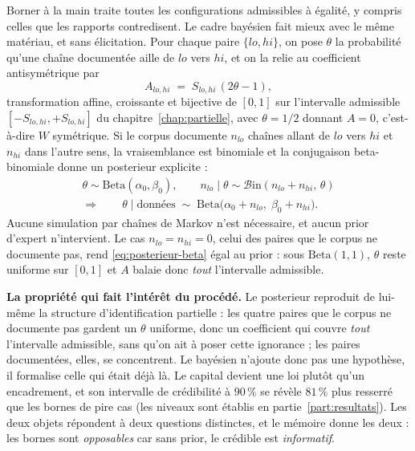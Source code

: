 Borner à la main traite toutes les configurations admissibles à égalité, y compris celles que
les rapports contredisent. Le cadre bayésien fait mieux avec le même matériau, et sans
élicitation. Pour chaque paire $\{lo,hi\}$, on pose $\theta$ la probabilité qu'une chaîne
documentée aille de $lo$ vers $hi$, et on la relie au coefficient antisymétrique par
\[
  A_{lo,hi} \;=\; S_{lo,hi}\,(2\theta - 1),
\]
transformation affine, croissante et bijective de $[0,1]$ sur l'intervalle admissible
$[-S_{lo,hi},+S_{lo,hi}]$ du chapitre~\ref{chap:partielle}, avec $\theta=1/2$ donnant $A=0$,
c'est-à-dire $W$ symétrique. Si le corpus documente $n_{lo}$ chaînes allant de $lo$ vers $hi$ et
$n_{hi}$ dans l'autre sens, la vraisemblance est binomiale et la conjugaison beta-binomiale
donne un posterieur explicite :
\begin{equation}
  \begin{gathered}
  \theta \sim \mathrm{Beta}(\alpha_0,\beta_0),
  \qquad
  n_{lo}\mid\theta \sim \mathcal{B}\mathrm{in}(n_{lo}+n_{hi},\,\theta)
  \\
  \Longrightarrow\qquad
  \theta \mid \text{données} \;\sim\; \mathrm{Beta}\bigl(\alpha_0+n_{lo},\;\beta_0+n_{hi}\bigr).
  \end{gathered}
  \label{eq:posterieur-beta}
\end{equation}
Aucune simulation par chaînes de Markov n'est nécessaire, et aucun prior d'expert n'intervient.
Le cas $n_{lo}=n_{hi}=0$, celui des paires que le corpus ne documente pas, rend
\eqref{eq:posterieur-beta} égal au prior : sous $\mathrm{Beta}(1,1)$, $\theta$ reste uniforme sur
$[0,1]$ et $A$ balaie donc \emph{tout} l'intervalle admissible.

\begin{cle}
\textbf{La propriété qui fait l'intérêt du procédé.} Le posterieur reproduit de
lui-même la structure d'identification partielle : les quatre paires que le corpus ne documente
pas gardent un $\theta$ uniforme, donc un coefficient qui couvre \emph{tout} l'intervalle
admissible, sans qu'on ait à poser cette ignorance ; les paires documentées, elles, se
concentrent. Le bayésien n'ajoute donc pas une hypothèse, il formalise celle qui était déjà là.
Le capital devient une loi plutôt qu'un encadrement, et son intervalle de crédibilité à
$90\,\%$ se révèle $81\,\%$ plus resserré que les bornes de pire cas (les niveaux sont établis
en partie~\ref{part:resultats}). Les deux objets répondent à deux questions distinctes, et le
mémoire donne les deux : les bornes sont \emph{opposables} car sans prior, le crédible est
\emph{informatif}.
\end{cle}


